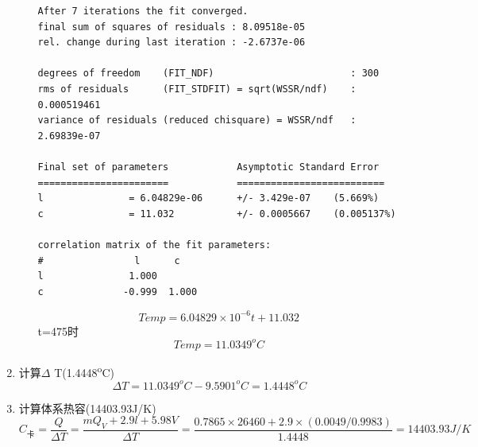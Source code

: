 \documentclass[11pt]{report}
\begin{document}
\begin{enumerate}
\begin{enumerate}
\begin{verbatim}
After 7 iterations the fit converged.
final sum of squares of residuals : 8.09518e-05
rel. change during last iteration : -2.6737e-06

degrees of freedom    (FIT_NDF)                        : 300
rms of residuals      (FIT_STDFIT) = sqrt(WSSR/ndf)    : 0.000519461
variance of residuals (reduced chisquare) = WSSR/ndf   : 2.69839e-07

Final set of parameters            Asymptotic Standard Error
=======================            ==========================
l               = 6.04829e-06      +/- 3.429e-07    (5.669%)
c               = 11.032           +/- 0.0005667    (0.005137%)

correlation matrix of the fit parameters:
#                l      c      
l               1.000 
c              -0.999  1.000 

\end{verbatim}
\[
Temp=6.04829\times 10^{-6}t+11.032
\]
t=475时
\[
Temp=11.0349^{o}C
\]
\end{enumerate}
\item 计算\(\Delta\) T(1.4448\textsuperscript{o}C)
\label{sec:org25ea4da}
\[
     \Delta T=11.0349^{o}C-9.5901^{o}C=1.4448^{o}C
     \]
\item 计算体系热容(14403.93J/K)
\label{sec:org86c0cf3}
\[
     C_{卡}=
     \frac{Q}{\Delta T}=
     \frac{mQ_{V}+2.9l+5.98V}{\Delta T}=
     \frac{0.7865\times 26460+2.9\times(0.0049/0.9983)}{1.4448}=
     14403.93J/K
     \]
\end{enumerate}
\end{document}
